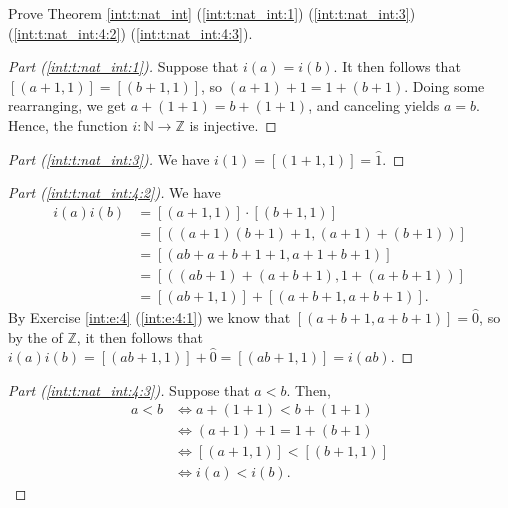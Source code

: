 \Newpage
\begin{exercise} %
	Prove Theorem \ref{int:t:nat_int} (\ref{int:t:nat_int:1}) (\ref{int:t:nat_int:3}) (\ref{int:t:nat_int:4:2}) (\ref{int:t:nat_int:4:3}).
\end{exercise}

\begin{proof}[Part (\ref{int:t:nat_int:1})]
	Suppose that $i(a) = i(b)$. It then follows that $[(a + 1, 1)] = [(b + 1, 1)]$, so $(a + 1) + 1 = 1 + (b + 1)$. Doing some rearranging, we get $a + (1 + 1) = b + (1 + 1)$, and canceling yields $a = b$. Hence, the function $i: \mathbb{N} \to \mathbb{Z}$ is injective.
\end{proof}

\begin{proof}[Part (\ref{int:t:nat_int:3})]
	We have $i(1) = [(1 + 1, 1)] = \hat{1}$.
\end{proof}

\begin{proof}[Part (\ref{int:t:nat_int:4:2})]
	We have
	\begin{align*}
		i(a)i(b) & = [(a + 1, 1)] \cdot [(b + 1, 1)]             \\
		         & = [((a + 1)(b + 1) + 1, (a + 1) + (b + 1))]   \\
		         & = [(ab + a + b + 1 + 1, a + 1 + b + 1)]       \\
		         & = [((ab + 1) + (a + b + 1), 1 + (a + b + 1))] \\
		         & = [(ab + 1, 1)] + [(a + b + 1, a + b + 1)].
	\end{align*}
	By Exercise \ref{int:e:4} (\ref{int:e:4:1}) we know that $[(a + b + 1, a + b + 1)] = \hat{0}$, so by the  of $\mathbb{Z}$, it then follows that $i(a)i(b) = [(ab + 1, 1)] + \hat{0} = [(ab + 1, 1)] = i(ab)$.
\end{proof}

\begin{proof}[Part (\ref{int:t:nat_int:4:3})]
	Suppose that $a < b$. Then,
	\begin{align*}
		a < b & \iff a + (1 + 1) < b + (1 + 1)   \\
		      & \iff (a + 1) + 1 = 1 + (b + 1)   \\
		      & \iff [(a + 1, 1)] < [(b + 1, 1)] \\
		      & \iff i(a) < i(b).
	\end{align*}
\end{proof}


